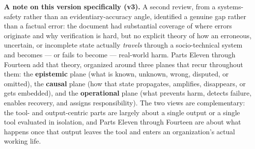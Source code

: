 \textbf{A note on this version specifically (v3).} A second review, from a systems-safety rather than an evidentiary-accuracy angle, identified a genuine gap rather than a factual error: the document had substantial coverage of where errors originate and why verification is hard, but no explicit theory of how an erroneous, uncertain, or incomplete state actually \emph{travels} through a socio-technical system and becomes --- or fails to become --- real-world harm. Parts Eleven through Fourteen add that theory, organized around three planes that recur throughout them: the \textbf{epistemic} plane (what is known, unknown, wrong, disputed, or omitted), the \textbf{causal} plane (how that state propagates, amplifies, disappears, or gets embedded), and the \textbf{operational} plane (what prevents harm, detects failure, enables recovery, and assigns responsibility). The two views are complementary: the tool- and output-centric parts are largely about a single output or a single tool evaluated in isolation, and Parts Eleven through Fourteen are about what happens once that output leaves the tool and enters an organization's actual working life.
